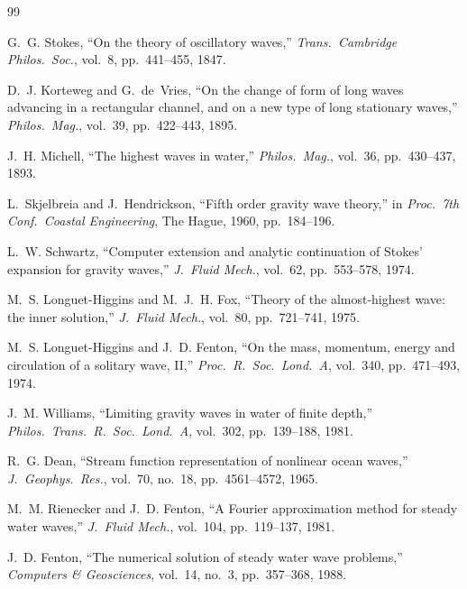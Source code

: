 \documentclass[journal,10pt,twocolumn]{IEEEtran}
\begin{document}
\begin{thebibliography}{99}

    G.~G. Stokes,
    ``On the theory of oscillatory waves,''
    \emph{Trans.\ Cambridge Philos.\ Soc.},
    vol.~8, pp.~441--455, 1847.

    D.~J. Korteweg and G.~de~Vries,
    ``On the change of form of long waves advancing in a rectangular
    channel, and on a new type of long stationary waves,''
    \emph{Philos.\ Mag.}, vol.~39, pp.~422--443, 1895.

    J.~H. Michell,
    ``The highest waves in water,''
    \emph{Philos.\ Mag.}, vol.~36, pp.~430--437, 1893.

    L.~Skjelbreia and J.~Hendrickson,
    ``Fifth order gravity wave theory,''
    in \emph{Proc.\ 7th Conf.\ Coastal Engineering},
    The Hague, 1960, pp.~184--196.

    L.~W. Schwartz,
    ``Computer extension and analytic continuation of Stokes' expansion
    for gravity waves,''
    \emph{J.\ Fluid Mech.}, vol.~62, pp.~553--578, 1974.

    M.~S. Longuet-Higgins and M.~J.~H. Fox,
    ``Theory of the almost-highest wave: the inner solution,''
    \emph{J.\ Fluid Mech.}, vol.~80, pp.~721--741, 1975.

    M.~S. Longuet-Higgins and J.~D. Fenton,
    ``On the mass, momentum, energy and circulation of a solitary wave,
    II,''
    \emph{Proc.\ R.\ Soc.\ Lond.\ A}, vol.~340, pp.~471--493, 1974.

    J.~M. Williams,
    ``Limiting gravity waves in water of finite depth,''
    \emph{Philos.\ Trans.\ R.\ Soc.\ Lond.\ A},
    vol.~302, pp.~139--188, 1981.

    R.~G. Dean,
    ``Stream function representation of nonlinear ocean waves,''
    \emph{J.\ Geophys.\ Res.}, vol.~70, no.~18,
    pp.~4561--4572, 1965.

    M.~M. Rienecker and J.~D. Fenton,
    ``A Fourier approximation method for steady water waves,''
    \emph{J.\ Fluid Mech.}, vol.~104, pp.~119--137, 1981.

    J.~D. Fenton,
    ``The numerical solution of steady water wave problems,''
    \emph{Computers \& Geosciences}, vol.~14, no.~3,
    pp.~357--368, 1988.


\end{thebibliography}
\end{document}
